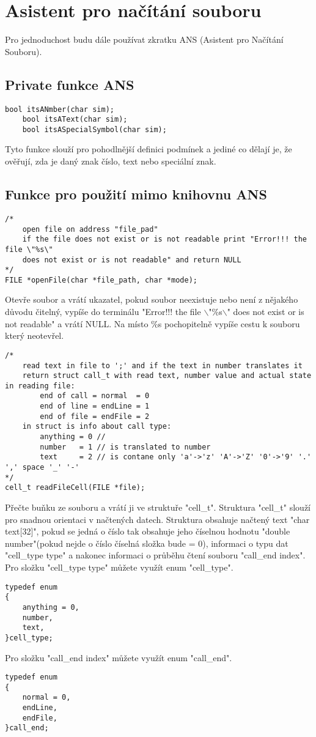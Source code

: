 \section{Asistent pro načítání souboru}
Pro jednoduchost budu dále používat zkratku ANS (Asistent pro Načítání Souboru).
\subsection{Private funkce ANS}
\begin{lstlisting}[style=CStyle]
    bool itsANmber(char sim);
    bool itsAText(char sim);
    bool itsASpecialSymbol(char sim);
\end{lstlisting}
Tyto funkce slouží pro pohodlnější definici podmínek a jediné co dělají je, že ověřují, zda je daný znak číslo, text nebo speciální znak.

\subsection{Funkce pro použití mimo knihovnu ANS}
\begin{lstlisting}[style=CStyle]
/*
    open file on address "file_pad"
    if the file does not exist or is not readable print "Error!!! the file \"%s\" 
    does not exist or is not readable" and return NULL 
*/
FILE *openFile(char *file_path, char *mode);
\end{lstlisting}
Otevře soubor a vrátí ukazatel, pokud soubor neexistuje nebo není z nějakého důvodu čitelný, vypíše do terminálu "Error!!! the file $\backslash$"\%s$\backslash$" does not exist or is not readable" a vrátí NULL.
Na místo \%s pochopitelně vypíše cestu k souboru který neotevřel.

\begin{lstlisting}[style=CStyle]
/*
    read text in file to ';' and if the text in number translates it
    return struct call_t with read text, number value and actual state in reading file:
        end of call = normal  = 0
        end of line = endLine = 1
        end of file = endFile = 2
    in struct is info about call type:
        anything = 0 //
        number   = 1 // is translated to number
        text     = 2 // is contane only 'a'->'z' 'A'->'Z' '0'->'9' '.' ',' space '_' '-'
*/
cell_t readFileCell(FILE *file);
\end{lstlisting}
Přečte buňku ze souboru a vrátí ji ve struktuře "cell\_t".
Struktura "cell\_t" slouží pro snadnou orientaci v načtených datech.
Struktura obsahuje načtený text "char text[32]", pokud se jedná o číslo tak obsahuje jeho číselnou hodnotu "double number"(pokud nejde o číslo číselná složka bude = 0), informaci o typu dat "cell\_type type" a nakonec informaci o průběhu čtení souboru "call\_end index".\\
Pro složku "cell\_type type" můžete využít enum "cell\_type".
\begin{lstlisting}[style=CStyle]
typedef enum  
{
    anything = 0,
    number,      
    text,        
}cell_type;
\end{lstlisting}
Pro složku "call\_end index" můžete využít enum "call\_end".
\begin{lstlisting}[style=CStyle]
typedef enum
{
    normal = 0,
    endLine,
    endFile,
}call_end;
\end{lstlisting}